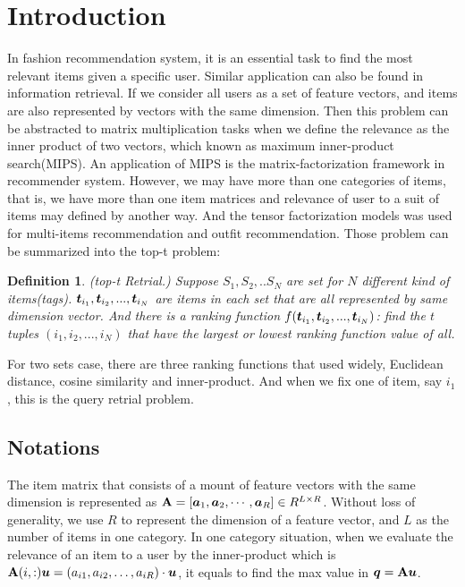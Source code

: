 \documentclass[letterpaper]{article}
\newcommand{\V}[1]{{\bm{{\MakeLowercase{#1}}}}}
\newcommand{\M}[1]{{\bm{\mathbf{\MakeUppercase{#1}}}}}
\newtheorem{definition}{Definition}
\begin{document}
\title{}
\date{}
\author{}
\maketitle

\section{Introduction}

In fashion recommendation system, it is an essential task to find the most relevant items given a specific user. Similar application can also be found in information retrieval. If we consider all users as a set of feature vectors, and items are also represented by vectors with the same dimension. Then this problem can be abstracted to matrix multiplication tasks when we define the relevance as the inner product of two vectors, which known as maximum inner-product search(MIPS). An application of MIPS is the  matrix-factorization framework in recommender system\cite{KoYe09}. However, we may have more than one categories of items, that is, we have more than one item matrices and relevance of user to a suit of items may defined by another way. And the tensor factorization models was used for multi-items recommendation\cite{Rendle10} and outfit recommendation\cite{HuYiLa15}. Those problem can be summarized into the top-t problem:

\begin{definition}\label{def:DefinitionTopt}
(top-t Retrial.) Suppose $S_1,S_2,..S_N$ are set for $N$ different kind of items(tags). $\V{t}_{i_1},\V{t}_{i_2},...,\V{t}_{i_N}$ are items in each set that are all represented by same dimension vector. And there is a ranking function $f(\V{t}_{i_1},\V{t}_{i_2},...,\V{t}_{i_N})$: find the $t$ tuples $(i_1,i_2,...,i_N)$ that have the largest or lowest ranking function value of all.
\end{definition}

For two sets case, there are three ranking functions that used widely, Euclidean distance, cosine similarity and inner-product. And when we fix one of item, say ${i_1}$, this is the query retrial problem.
\subsection{Notations}

The item matrix that consists of a mount of feature vectors with the same dimension is represented as $\M{A} =
[\V{a}_{1},\V{a}_{2},\cdots,\V{a}_{R}]\in R^{L\times R}$.  Without loss of generality, we use $R$ to represent the dimension of a feature vector, and $L$ as the number of items in one category. In one category situation, when we evaluate the relevance of an item to a user by the inner-product which is $\M{A}(i,:)\V{u}=(a_{i1},a_{i2},\ldots,a_{iR})\cdot\V{u}$, it equals to find the max value in $\V{q} = \M{a}\V{u}$.
\end{document}
